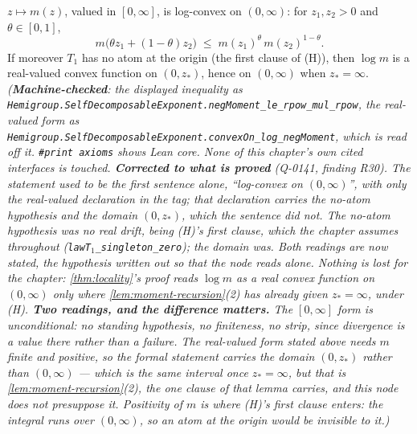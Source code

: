 \begin{lemma}\label{lem:log-convexity}
\leanok
$z \mapsto m(z)$, valued in $[0,\infty]$, is log-convex on $(0, \infty)$: for $z_1, z_2 > 0$ and
$\theta \in [0,1]$,
\[
  m\bigl(\theta z_1 + (1-\theta) z_2\bigr) \;\le\; m(z_1)^{\theta}\,m(z_2)^{1-\theta} .
\]
If moreover $T_1$ has no atom at the origin (the first clause of (H)), then $\log m$ is a
real-valued convex function on $(0, z_*)$, hence on $(0,\infty)$ when $z_* = \infty$.
\statusT\quad\emph{(\textbf{Machine-checked}: the displayed inequality as
\texttt{Hemigroup.SelfDecomposableExponent.negMoment\_le\_rpow\_mul\_rpow}, the real-valued
form as \texttt{Hemigroup.SelfDecomposableExponent.convexOn\_log\_negMoment}, which is read off
it. \texttt{\#print axioms} shows Lean core. None of this chapter's own cited
interfaces is touched.
\textbf{Corrected to what is proved} (Q-0141, finding R30). The statement used to be the first
sentence alone, ``log-convex on $(0,\infty)$'', with only the real-valued declaration in the tag;
that declaration carries the no-atom hypothesis and the domain $(0, z_*)$, which the sentence did
not. The no-atom hypothesis was no real drift, being (H)'s first clause, which the chapter assumes
throughout (\texttt{lawT}$_1$\texttt{\_singleton\_zero}); the domain was. Both readings are now
stated, the hypothesis written out so that the node reads alone. Nothing is lost for the chapter: \ref{thm:locality}'s proof
reads $\log m$ as a real convex function on $(0,\infty)$ only where \ref{lem:moment-recursion}(2)
has already given $z_* = \infty$, under (H).
\textbf{Two readings, and the difference matters.} The $[0,\infty]$ form is
\emph{unconditional}: no standing hypothesis, no finiteness, no strip, since divergence is a
value there rather than a failure. The real-valued form stated above needs $m$ finite and
positive, so the formal statement carries the domain $(0, z_*)$ rather than $(0,\infty)$ ---
which is the same interval once $z_* = \infty$, but that is \ref{lem:moment-recursion}(2), the
one clause of that lemma  carries, and this node does not presuppose it. Positivity
of $m$ is where (H)'s first clause enters: the integral runs over $(0,\infty)$, so an atom at the
origin would be invisible to it.)}
\end{lemma}

